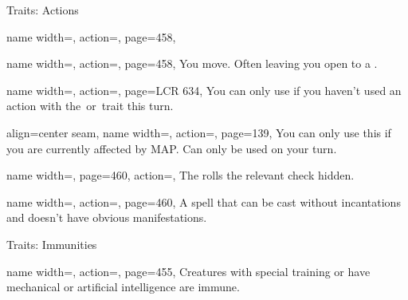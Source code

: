 \begin{PageFront}
\begin{Tables}{\frontTableHeight}
\begin{Table}{Traits: Actions}
\begin{entry}{}{%
                name width=\conditionLength,%
                action=\Manipulate,
                page=458,
            }
            \end{entry}
            \begin{entry}{}{%
                name width=\conditionLength,%
                action=\Move,
                page=458,
            }
                You move. Often leaving you open to a .
            \end{entry}
            \begin{entry}{}{%
                name width=\conditionLength,%
                action=\Open,
                page=LCR 634,
            }
                You can only use if you haven't used an action with the \Attack\,or \Open\,trait this turn.
            \end{entry}
            \begin{entry}{}{%
                align=center seam,
                name width=\conditionLength,%
                action=\Press,
                page=139,
            }
                You can only use this if you are currently affected by MAP. Can only be used on your turn.\\
            \end{entry}
            \begin{entry}{}{%
                name width=\conditionLength,%
                page=460,
                action=\Secret {},
            }
                The \GM rolls the relevant check hidden.
            \end{entry}
            \begin{entry}{}{%
                name width=\conditionLength,%
                action=\Subtle,
                page=460,
            }
                A spell that can be cast without incantations and doesn't have obvious manifestations. \hfill {}
            \end{entry}
        \end{Table}
        \TableSpace
        \begin{Table}{Traits: Immunities}
            \begin{entry}{}{%
                name width=\conditionLength,%
                action=\Emotion,
                page=455,
            }
                Creatures with special training or have mechanical or artificial intelligence are immune.

\end{entry}
\end{Table}
\end{Tables}
\end{PageFront}

